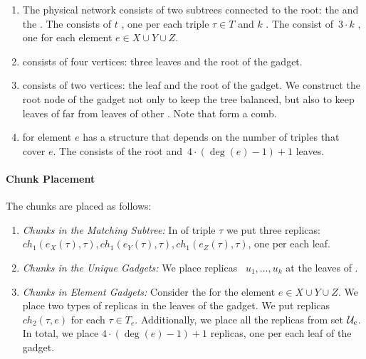 \begin{enumerate}
  \item The physical network consists of two subtrees connected to the
  root: the {\MatchSubtree} and the {\CoverSubtree}. The
  {\MatchSubtree} consists of $t$ {\TripleGadgets}, one per each triple $\tau\in T$ and $k$
  {\UnqGadgets}. The {\CoverSubtree} consist of~$3\cdot k$ {\ElGadgets}, one for each element $e\in X\cup Y\cup Z$.
  \item {\TripleGadget} consists of four vertices: three leaves and the root of the gadget.
  \item {\UnqGadget} consists of two vertices: the leaf and the root of the gadget.
  We construct the root node of the gadget not only to keep the tree balanced, but also to keep leaves of
  {\UnqGadgets} far from leaves of other \UnqGadgets. Note that \UnqGadgets{} form a comb.
  \item {\ElGadget} for element $e$ has a structure that depends on the number of triples that cover $e$. The {\ElGadget} consists of the
  root and~$4\cdot(\deg(e)-1)+1$ leaves.
\end{enumerate}

\paragraph{Chunk Placement}
The chunks are placed as follows:
\begin{enumerate}
  \item \emph{Chunks in the Matching Subtree:} In {\TripleGadget} of triple $\tau$ we put
  three replicas:
 ~$ch_1(e_X(\tau), \tau), ch_1(e_Y(\tau), \tau), ch_1(e_Z(\tau), \tau)$, one per each leaf.
  \item \emph{Chunks in the Unique Gadgets:} We place replicas
 ~$u_1,\ldots, u_k$ at the leaves of \UnqGadgets.
 \item \emph{Chunks in Element Gadgets:} Consider the \ElGadget{} for the element $e \in X\cup Y\cup Z$.
 We place two types of replicas in the leaves of the gadget.
 We put replicas $ch_2(\tau, e)$ for each $\tau \in T_e$.
 Additionally, we place all the replicas from set ${\mathcal{U}_e}$.
 In total, we place $4\cdot (\deg(e) - 1) + 1$ replicas, one per each leaf of the gadget.
\end{enumerate}

